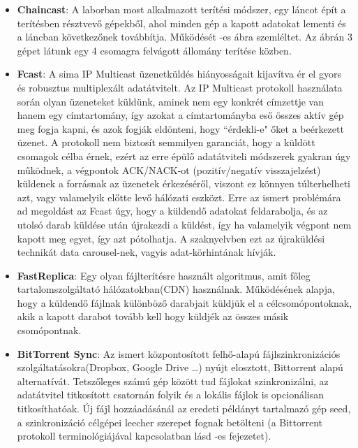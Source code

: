 \begin{itemize}
  \item \textbf{Chaincast}: A laborban most alkalmazott terítési módszer, egy láncot épít a terítésben résztvevő gépekből, ahol minden gép a kapott adatokat lementi és a láncban következőnek továbbítja. Működését -es ábra szemléltet. Az ábrán 3 gépet látunk egy 4 csomagra felvágott állomány terítése közben.
  \item \textbf{Fcast}\cite{gemmell2000fcast}: A sima IP Multicast üzenetküldés hiányosságait kijavítva ér el gyors és robusztus multiplexált adatátvitelt. Az IP Multicast protokoll használata során olyan üzeneteket küldünk, aminek nem egy konkrét címzettje van hanem egy címtartomány, így azokat a címtartományba eső összes aktív gép meg fogja kapni, és azok fogják eldönteni, hogy ``érdekli-e" őket a beérkezett üzenet. A protokoll nem biztosít semmilyen garanciát, hogy a küldött csomagok célba érnek, ezért az erre épülő adatátviteli módszerek gyakran úgy működnek, a végpontok ACK/NACK-ot (pozitív/negatív visszajelzést) küldenek a forrásnak az üzenetek érkezéséről, viszont ez könnyen túlterhelheti azt, vagy valamelyik előtte levő hálózati eszközt. Erre az ismert problémára ad megoldást az Fcast úgy, hogy a küldendő adatokat feldarabolja, és az utolsó darab küldése után újrakezdi a küldést, így ha valamelyik végpont nem kapott meg egyet, így azt pótolhatja. A szaknyelvben ezt az újraküldési technikát data carousel-nek, vagyis adat-körhintának hívják.
  \item \textbf{FastReplica}\cite{cherkasova2003fastreplica}:  Egy olyan fájlterítésre használt algoritmus, amit főleg tartalomszolgáltató hálózatokban(CDN) használnak. Működésének alapja, hogy a küldendő fájlnak különböző darabjait küldjük el a célcsomópontoknak, akik a kapott darabot tovább kell hogy küldjék az összes másik csomópontnak.
  \item \textbf{BitTorrent Sync}\cite{farina2014bittorrent}: Az ismert központosított felhő-alapú fájlszinkronizációs szolgáltatásokra(Dropbox, Google Drive \ldots) nyújt elosztott, Bittorrent alapú alternatívát. Tetszőleges számú gép között tud fájlokat szinkronizálni, az adatátvitel titkosított csatornán folyik és a lokális fájlok is opcionálisan titkosíthatóak. Új fájl hozzáadásánál az eredeti példányt tartalmazó gép seed, a szinkronizáció célgépei leecher szerepet fognak betölteni (a Bittorrent protokoll terminológiájával kapcsolatban lásd -es fejezetet).
\end{itemize}

